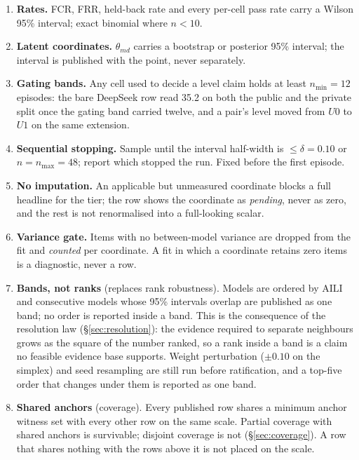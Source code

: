 \begin{enumerate}[leftmargin=1.6em,itemsep=2pt]
\item \textbf{Rates.} FCR, FRR, held-back rate and every per-cell pass rate carry a Wilson 95\% interval; exact binomial where $n < 10$.
\item \textbf{Latent coordinates.} $\theta_{md}$ carries a bootstrap or posterior 95\% interval; the interval is published with the point, never separately.
\item \textbf{Gating bands.} Any cell used to decide a level claim holds at least $n_{\min} = 12$ episodes: the bare DeepSeek row read 35.2 on both the public and the private split once the gating band carried twelve, and a pair's level moved from $U0$ to $U1$ on the same extension.
\item \textbf{Sequential stopping.} Sample until the interval half-width is $\le \delta = 0.10$ or $n = n_{\max} = 48$; report which stopped the run. Fixed before the first episode.
\item \textbf{No imputation.} An applicable but unmeasured coordinate blocks a full headline for the tier; the row shows the coordinate as \emph{pending}, never as zero, and the rest is not renormalised into a full-looking scalar.
\item \textbf{Variance gate.} Items with no between-model variance are dropped from the fit and \emph{counted} per coordinate. A fit in which a coordinate retains zero items is a diagnostic, never a row.
\item \textbf{Bands, not ranks} (replaces rank robustness). Models are ordered by $\mathrm{AILI}$ and consecutive models whose 95\% intervals overlap are published as one band; no order is reported inside a band. This is the consequence of the resolution law (\S\ref{sec:resolution}): the evidence required to separate neighbours grows as the square of the number ranked, so a rank inside a band is a claim no feasible evidence base supports. Weight perturbation ($\pm 0.10$ on the simplex) and seed resampling are still run before ratification, and a top-five order that changes under them is reported as one band.
\item \textbf{Shared anchors} (coverage). Every published row shares a minimum anchor witness set with every other row on the same scale. Partial coverage with shared anchors is survivable; disjoint coverage is not (\S\ref{sec:coverage}). A row that shares nothing with the rows above it is not placed on the scale.
\end{enumerate}


